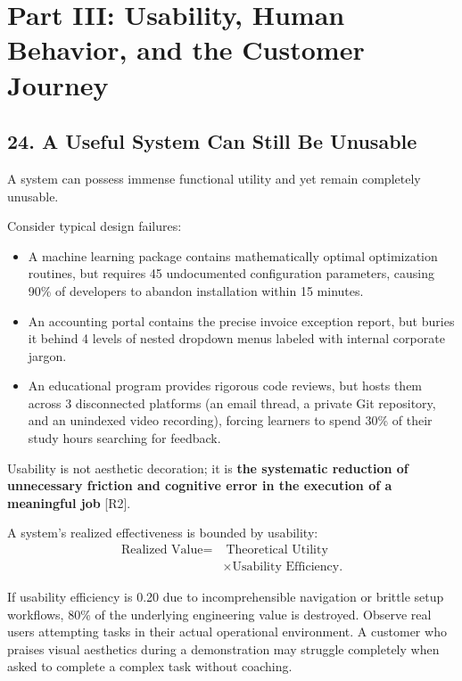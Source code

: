 \section*{Part III: Usability, Human Behavior, and the Customer Journey}

\subsection*{24. A Useful System Can Still Be Unusable}

A system can possess immense functional utility and yet remain completely unusable.

Consider typical design failures:
\begin{itemize}
    \item A machine learning package contains mathematically optimal optimization routines, but requires 45 undocumented configuration parameters, causing 90\% of developers to abandon installation within 15 minutes.
    \item An accounting portal contains the precise invoice exception report, but buries it behind 4 levels of nested dropdown menus labeled with internal corporate jargon.
    \item An educational program provides rigorous code reviews, but hosts them across 3 disconnected platforms (an email thread, a private Git repository, and an unindexed video recording), forcing learners to spend 30\% of their study hours searching for feedback.
\end{itemize}

Usability is not aesthetic decoration; it is \textbf{the systematic reduction of unnecessary friction and cognitive error in the execution of a meaningful job} [R2].

A system's realized effectiveness is bounded by usability:
\begin{equation}
\begin{aligned}
\text{Realized Value} = &\;\text{Theoretical Utility} \\
&\times \text{Usability Efficiency}.
\end{aligned}
\end{equation}

If usability efficiency is 0.20 due to incomprehensible navigation or brittle setup workflows, 80\% of the underlying engineering value is destroyed. Observe real users attempting tasks in their actual operational environment. A customer who praises visual aesthetics during a demonstration may struggle completely when asked to complete a complex task without coaching.

